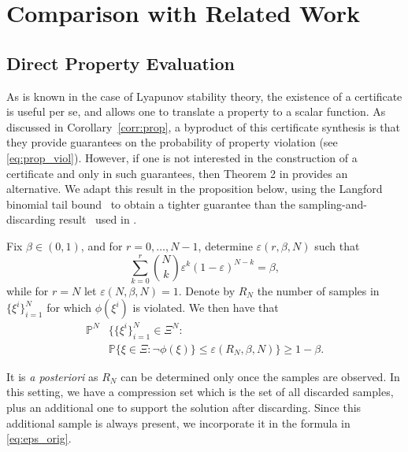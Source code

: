 \section{Comparison with Related Work}
\label{sec:related}
\subsection{Direct Property Evaluation}
\label{sec:related:direct_prop}
As is known in the case of Lyapunov stability theory, the existence of a certificate is useful per se, and allows one to translate a property to a scalar function. 
As discussed in Corollary~\ref{corr:prop}, a byproduct of this certificate synthesis is that they provide guarantees on the probability of property violation (see \eqref{eq:prop_viol}). 
However, if one is not interested in the construction of a certificate and only in such guarantees, then Theorem 2 in \cite{DBLP:journals/sttt/BadingsCJJKT22} provides an alternative. 
We adapt this result in the proposition below, using the Langford binomial tail bound~\cite{JMLR:v6:langford05a} to obtain a tighter guarantee than the sampling-and-discarding result~\cite{DBLP:journals/jota/CampiG11} used in \cite{DBLP:journals/sttt/BadingsCJJKT22}.
\begin{prop}
\label{corr:a_post}
Fix $\beta \in (0,1)$, and for $r = 0,\ldots,N-1$,
determine $\varepsilon(r,\beta,N)$ such that 
    \begin{equation}   
    \label{eq:eps_orig}
     \sum_{k=0}^r\binom{N}{k} \varepsilon^k(1-\varepsilon)^{N-k}=\beta,
    \end{equation}
  while for $r=N$ let $\varepsilon(N,\beta,N) = 1$.   
	Denote by $R_N$ the number of samples in $\{\xi^i\}_{i =1}^{N}$ for which $\phi(\xi^i)$ is violated.
    We then have that
    \begin{align}
	    \mathbb{P}^N &\big \{ \{\xi^i\}_{i=1}^N \in \Xi^N:~\nonumber \\
        &\mathbb{P}\{\xi \in \Xi \colon \neg\phi(\xi) \} \leq \varepsilon(R_N,\beta,N)\big\}
        \geq 1-\beta. \label{eq:prop_direct}
    \end{align}
\end{prop}
It is \emph{a posteriori} as $R_N$ can be determined only once the samples are observed. 
In this setting, we have a compression set which is the set of all discarded samples, plus an additional one to support the solution after discarding.
Since this additional sample is always present, we incorporate it in the formula in \eqref{eq:eps_orig}. 

